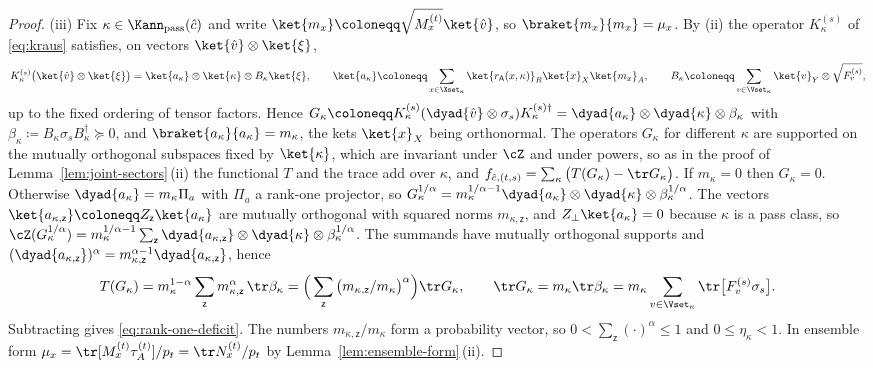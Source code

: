 \begin{proof}
(iii) Fix $\kappa\in\Kann_{\mathrm{pass}}(\hat c)$ and write
$\ket{m_x}\coloneqq\sqrt{M^{(t)}_x}\ket{\hat v}$, so
$\braket{m_x}{m_x}=\mu_x$. By (ii) the operator $K^{(s)}_{\kappa}$ of
\eqref{eq:kraus} satisfies, on vectors $\ket{\hat v}\otimes\ket{\xi}$,
\begin{equation*}
  K^{(s)}_{\kappa}\big(\ket{\hat v}\otimes\ket{\xi}\big)
  =\ket{a_{\kappa}}\otimes\ket{\kappa}\otimes B_{\kappa}\ket{\xi},\qquad
  \ket{a_{\kappa}}\coloneqq\sum_{x\in\Xset_{\kappa}}
  \ket{r_{\mathsf A}(x,\kappa)}_R\ket{x}_X\ket{m_x}_A,\qquad
  B_{\kappa}\coloneqq\sum_{v\in\Vset_{\kappa}}\ket{v}_Y\otimes\sqrt{F^{(s)}_v},
\end{equation*}
up to the fixed ordering of tensor factors. Hence
$G_{\kappa}\coloneqq K^{(s)}_{\kappa}(\dyad{\hat v}\otimes\sigma_s)
K^{(s)\dagger}_{\kappa}=\dyad{a_{\kappa}}\otimes\dyad{\kappa}\otimes
\beta_{\kappa}$ with $\beta_{\kappa}\coloneqq B_{\kappa}\sigma_sB_{\kappa}^{\dagger}
\succeq0$, and $\braket{a_{\kappa}}{a_{\kappa}}=m_{\kappa}$, the kets
$\ket{x}_X$ being orthonormal. The operators $G_{\kappa}$ for different
$\kappa$ are supported on the mutually orthogonal subspaces fixed by
$\ket{\kappa}$, which are invariant under $\cZ$ and under powers, so as in
the proof of Lemma~\ref{lem:joint-sectors}\,(ii) the functional $T$ and the
trace add over $\kappa$, and
$f_{\hat c,(t,s)}=\sum_{\kappa}\big(T(G_{\kappa})-\tr G_{\kappa}\big)$. If
$m_{\kappa}=0$ then $G_{\kappa}=0$. Otherwise
$\dyad{a_{\kappa}}=m_{\kappa}\Pi_a$ with $\Pi_a$ a rank-one projector, so
$G_{\kappa}^{1/\alpha}=m_{\kappa}^{1/\alpha-1}\dyad{a_{\kappa}}\otimes
\dyad{\kappa}\otimes\beta_{\kappa}^{1/\alpha}$. The vectors
$\ket{a_{\kappa,\mathsf z}}\coloneqq Z_{\mathsf z}\ket{a_{\kappa}}$ are
mutually orthogonal with squared norms $m_{\kappa,\mathsf z}$, and
$Z_{\perp}\ket{a_{\kappa}}=0$ because $\kappa$ is a pass class, so
$\cZ(G_{\kappa}^{1/\alpha})=m_{\kappa}^{1/\alpha-1}\sum_{\mathsf z}
\dyad{a_{\kappa,\mathsf z}}\otimes\dyad{\kappa}\otimes
\beta_{\kappa}^{1/\alpha}$. The summands have mutually orthogonal supports
and $(\dyad{a_{\kappa,\mathsf z}})^{\alpha}
=m_{\kappa,\mathsf z}^{\alpha-1}\dyad{a_{\kappa,\mathsf z}}$, hence
\begin{equation*}
  T(G_{\kappa})=m_{\kappa}^{1-\alpha}\sum_{\mathsf z}
  m_{\kappa,\mathsf z}^{\alpha}\,\tr\beta_{\kappa}
  =\Big(\sum_{\mathsf z}\big(m_{\kappa,\mathsf z}/m_{\kappa}\big)^{\alpha}\Big)
  \tr G_{\kappa},\qquad
  \tr G_{\kappa}=m_{\kappa}\tr\beta_{\kappa}
  =m_{\kappa}\sum_{v\in\Vset_{\kappa}}\tr\big[F^{(s)}_v\sigma_s\big].
\end{equation*}
Subtracting gives \eqref{eq:rank-one-deficit}. The numbers
$m_{\kappa,\mathsf z}/m_{\kappa}$ form a probability vector, so
$0<\sum_{\mathsf z}(\cdot)^{\alpha}\le1$ and $0\le\eta_{\kappa}<1$. In
ensemble form $\mu_x=\tr[M^{(t)}_x\tau^{(t)}_A]/p_t=\tr N^{(t)}_x/p_t$ by
Lemma~\ref{lem:ensemble-form}\,(ii).


\end{proof}
